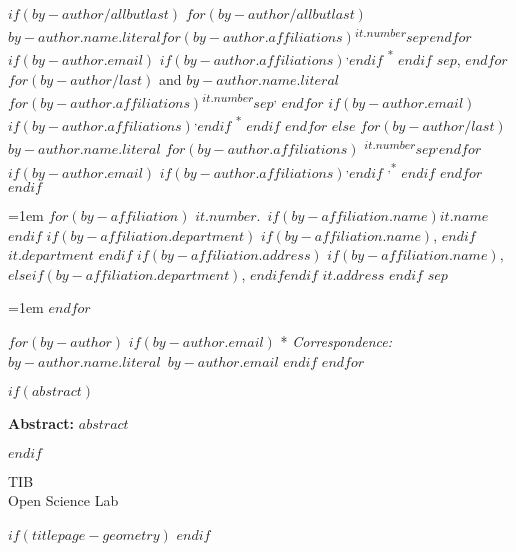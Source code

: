 \begin{tcolorbox}

$if(by-author/allbutlast)$
  $for(by-author/allbutlast)$
    {\large{$by-author.name.literal$}}$for(by-author.affiliations)${\textsuperscript{$it.number$}}$sep$\textsuperscript{,}$endfor$%
  $if(by-author.email)$%
  $if(by-author.affiliations)$\textsuperscript{,}$endif$%
  {\textsuperscript{*}}%
  $endif$%
  $sep$, 
  $endfor$
  $for(by-author/last)$%
    { and \large{$by-author.name.literal$}}%
  $for(by-author.affiliations)${\textsuperscript{$it.number$}}$sep$\textsuperscript{,}%
  $endfor$%
  $if(by-author.email)$%
    $if(by-author.affiliations)$\textsuperscript{,}$endif$%
    {\textsuperscript{*}}%
  $endif$%
  $endfor$
  $else$
  $for(by-author/last)$%
    {\large{$by-author.name.literal$}}%
    $for(by-author.affiliations)$%
    {\textsuperscript{$it.number$}}$sep$\textsuperscript{,}$endfor$%
  $if(by-author.email)$%
    $if(by-author.affiliations)$\textsuperscript{,}$endif$%
    {\textsuperscript{,*}}%
$endif$%
$endfor$
$endif$

\vspace{2\baselineskip} 

\hangindent=1em
$for(by-affiliation)$%
{$it.number$}.~$if(by-affiliation.name)${$it.name$}$endif$%
$if(by-affiliation.department)$%
$if(by-affiliation.name)$, $endif$%
{$it.department$}%
$endif$%
$if(by-affiliation.address)$%
$if(by-affiliation.name)$, $else$$if(by-affiliation.department)$, $endif$$endif$%
{$it.address$}%
$endif$%
$sep$\par\hangindent=1em%
$endfor$

\vspace{1\baselineskip} 

$for(by-author)$
$if(by-author.email)$
* \textit{Correspondence:}~$by-author.name.literal$~$by-author.email$\newline
$endif$
$endfor$

\end{tcolorbox}

$if(abstract)$
\begin{tcolorbox}

  \textbf{Abstract:\newline}
  $abstract$

\end{tcolorbox}
$endif$


\vfill

\vspace{1\baselineskip} 

\begin{tcolorbox}
\centering

{
  TIB\\
  Open Science Lab
}
\end{tcolorbox}

$if(titlepage-geometry)$
  \restoregeometry
$endif$
